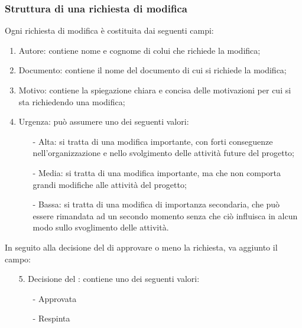 		\subsubsection{Struttura di una richiesta di modifica}
			Ogni richiesta di modifica è costituita dai seguenti campi:
			\begin{enumerate}
				\item Autore: contiene nome e cognome di colui che richiede la modifica;
				\item Documento: contiene il nome del documento di cui si richiede la modifica;
				\item Motivo: contiene la spiegazione chiara e concisa delle motivazioni per cui si sta richiedendo una modifica;
				\item Urgenza: può assumere uno dei seguenti valori:
					\begin{itemize}
						\item [-] Alta: si tratta di una modifica importante, con forti conseguenze nell'organizzazione e nello svolgimento delle attività future del progetto;
						\item [-] Media: si tratta di una modifica importante, ma che non comporta grandi modifiche alle attività del progetto;
						\item [-] Bassa: si tratta di una modifica di importanza secondaria, che può essere rimandata ad un secondo momento senza che ciò influisca in alcun modo sullo svoglimento delle attività.
					\end{itemize}
			\end{enumerate}
			In seguito alla decisione del  di approvare o meno la richiesta, va aggiunto il campo:
			\begin{itemize}
				\item [5.] Decisione del : contiene uno dei seguenti valori:
					\begin{itemize}
						\item [-] Approvata
						\item [-] Respinta
					\end{itemize}
			\end{itemize}
	

